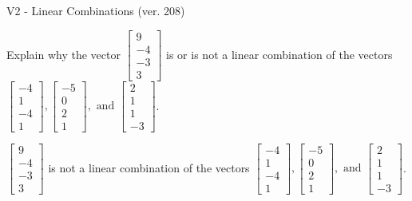 \begin{exercise}
  \begin{exerciseTitle}V2 - Linear Combinations (ver. 208)\end{exerciseTitle}
  \begin{exerciseStatement}
    Explain why the vector \(\left[\begin{array}{c}
9 \\
-4 \\
-3 \\
3
\end{array}\right]\)  is or is not a linear 
	combination of the vectors \(\left[\begin{array}{c}
-4 \\
1 \\
-4 \\
1
\end{array}\right] , \left[\begin{array}{c}
-5 \\
0 \\
2 \\
1
\end{array}\right] , \text{ and } \left[\begin{array}{c}
2 \\
1 \\
1 \\
-3
\end{array}\right]\).
	


  \end{exerciseStatement}
  \begin{exerciseAnswer}
   \(\left[\begin{array}{c}
9 \\
-4 \\
-3 \\
3
\end{array}\right]\) 
  	 is not  
	a linear combination of the vectors \(\left[\begin{array}{c}
-4 \\
1 \\
-4 \\
1
\end{array}\right] , \left[\begin{array}{c}
-5 \\
0 \\
2 \\
1
\end{array}\right] , \text{ and } \left[\begin{array}{c}
2 \\
1 \\
1 \\
-3
\end{array}\right]\).

	
  


  \end{exerciseAnswer}
\end{exercise}